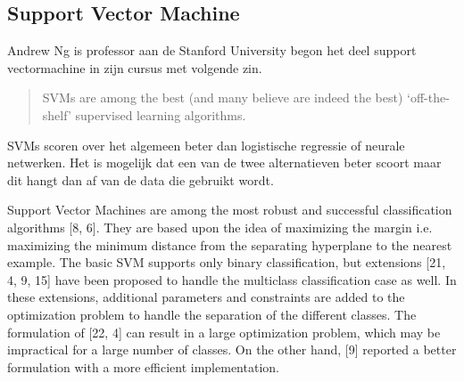 \subsection{Support Vector Machine}
\label{sec:Support-Vector-Machine}
Andrew Ng is professor aan de Stanford University begon het deel support vectormachine in zijn cursus \autocite{cursusAndrewNg} met volgende zin.
\begin{quote}
	SVMs are among the best (and many believe are indeed the best) ‘off-the-shelf’ supervised learning algorithms.
\end{quote}

SVMs scoren over het algemeen beter dan logistische regressie of neurale netwerken. Het is mogelijk dat een van de twee alternatieven beter scoort maar dit hangt dan af van de data die gebruikt wordt. 



Support Vector Machines are among the most robust and successful classification algorithms [8, 6]. They are based upon the idea of maximizing the margin i.e. maximizing the minimum distance from the separating hyperplane to the nearest example. The basic SVM supports only binary classification, but extensions [21, 4, 9, 15] have been proposed to handle the multiclass classification case as well. In these extensions, additional parameters and constraints are added to the optimization problem to handle the separation of the different classes. The formulation of [22, 4] can result in a large optimization problem, which may be impractical for a large number of classes. On the other hand, [9] reported a better formulation with a more efficient implementation.

